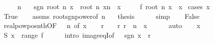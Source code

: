 \begin{isabellebody}
\ \ \ {\isachardoublequoteopen}{}\ {\isacharless}{\kern0pt}\ n{\isachardoublequoteclose}\isanewline
\ \ \ {\isachardoublequoteopen}sgn\ {\isacharparenleft}{\kern0pt}root\ n\ x{\isacharparenright}{\kern0pt}\ {\isacharasterisk}{\kern0pt}\ {\isasymbar}{\isacharparenleft}{\kern0pt}root\ n\ x{\isacharparenright}{\kern0pt}{\isasymbar}{\isacharcircum}{\kern0pt}n\ {\isacharequal}{\kern0pt}\ x{\isachardoublequoteclose}\isanewline
\ \ \ \ {\isacharparenleft}{\kern0pt}\ {\isachardoublequoteopen}{\isacharquery}{\kern0pt}f\ {\isacharparenleft}{\kern0pt}root\ n\ x{\isacharparenright}{\kern0pt}\ {\isacharequal}{\kern0pt}\ x{\isachardoublequoteclose}{\isacharparenright}{\kern0pt}\isanewline
%
\isadelimproof
%
\endisadelimproof
%
\isatagproof
{}\isamarkupfalse%
\ {\isacharparenleft}{\kern0pt}cases\ {\isachardoublequoteopen}x\ {\isacharequal}{\kern0pt}\ {}{\isachardoublequoteclose}{\isacharparenright}{\kern0pt}\isanewline
\ \ \isamarkupfalse%
\ True\isanewline
\ \ \isamarkupfalse%
\ assms\ root{\isacharunderscore}{\kern0pt}sgn{\isacharunderscore}{\kern0pt}power{\isacharbrackleft}{\kern0pt}of\ n\ {}{\isacharbrackright}{\kern0pt}\ \isamarkupfalse%
\ {\isacharquery}{\kern0pt}thesis\isanewline
\ \ \ \ \isamarkupfalse%
\ simp\isanewline
{}\isamarkupfalse%
\isanewline
\ \ \isamarkupfalse%
\ False\isanewline
\ \ \isamarkupfalse%
\ realpow{\isacharunderscore}{\kern0pt}pos{\isacharunderscore}{\kern0pt}nth{\isacharbrackleft}{\kern0pt}OF\ {\isacartoucheopen}{}\ {\isacharless}{\kern0pt}\ n{\isacartoucheclose}{\isacharcomma}{\kern0pt}\ of\ {\isachardoublequoteopen}{\isasymbar}x{\isasymbar}{\isachardoublequoteclose}{\isacharbrackright}{\kern0pt}\isanewline
\ \ \isamarkupfalse%
\ r\ \ {\isachardoublequoteopen}{}\ {\isacharless}{\kern0pt}\ r{\isachardoublequoteclose}\ {\isachardoublequoteopen}r\ {\isacharcircum}{\kern0pt}\ n\ {\isacharequal}{\kern0pt}\ {\isasymbar}x{\isasymbar}{\isachardoublequoteclose}\isanewline
\ \ \ \ \isamarkupfalse%
\ auto\isanewline
\ \ \isamarkupfalse%
\ {\isacartoucheopen}x\ {\isasymnoteq}\ {}{\isacartoucheclose}\ \isamarkupfalse%
\ S{\isacharcolon}{\kern0pt}\ {\isachardoublequoteopen}x\ {\isasymin}\ range\ {\isacharquery}{\kern0pt}f{\isachardoublequoteclose}\isanewline
\ \ \ \ \isamarkupfalse%
\ {\isacharparenleft}{\kern0pt}intro\ image{\isacharunderscore}{\kern0pt}eqI{\isacharbrackleft}{\kern0pt}of\ {\isacharunderscore}{\kern0pt}\ {\isacharunderscore}{\kern0pt}\ {\isachardoublequoteopen}sgn\ x\ {\isacharasterisk}{\kern0pt}\ r{\isachardoublequoteclose}{\isacharbrackright}{\kern0pt}{\isacharparenright}{\kern0pt}\isanewline

\end{isabellebody}
